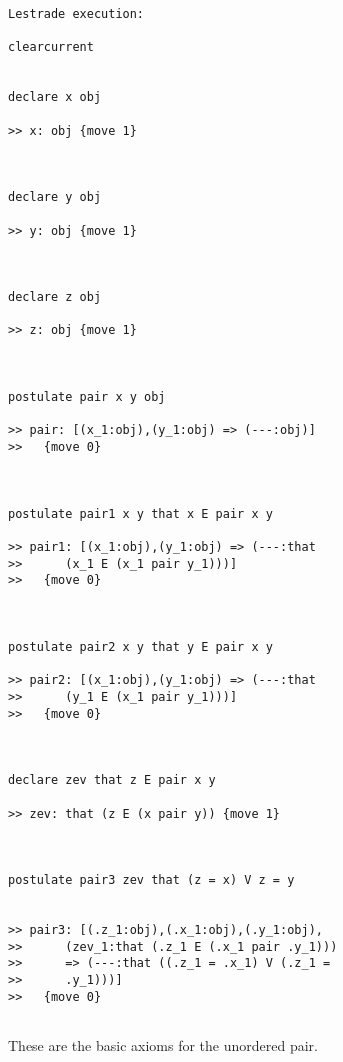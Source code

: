 \documentclass{article}
\begin{document}
\begin{verbatim}Lestrade execution:

clearcurrent


declare x obj

>> x: obj {move 1}



declare y obj

>> y: obj {move 1}



declare z obj

>> z: obj {move 1}



postulate pair x y obj

>> pair: [(x_1:obj),(y_1:obj) => (---:obj)]
>>   {move 0}



postulate pair1 x y that x E pair x y

>> pair1: [(x_1:obj),(y_1:obj) => (---:that
>>      (x_1 E (x_1 pair y_1)))]
>>   {move 0}



postulate pair2 x y that y E pair x y

>> pair2: [(x_1:obj),(y_1:obj) => (---:that
>>      (y_1 E (x_1 pair y_1)))]
>>   {move 0}



declare zev that z E pair x y

>> zev: that (z E (x pair y)) {move 1}



postulate pair3 zev that (z = x) V z = y


>> pair3: [(.z_1:obj),(.x_1:obj),(.y_1:obj),
>>      (zev_1:that (.z_1 E (.x_1 pair .y_1)))
>>      => (---:that ((.z_1 = .x_1) V (.z_1 =
>>      .y_1)))]
>>   {move 0}


\end{verbatim}

These are the basic axioms for the unordered pair.
\end{document}
